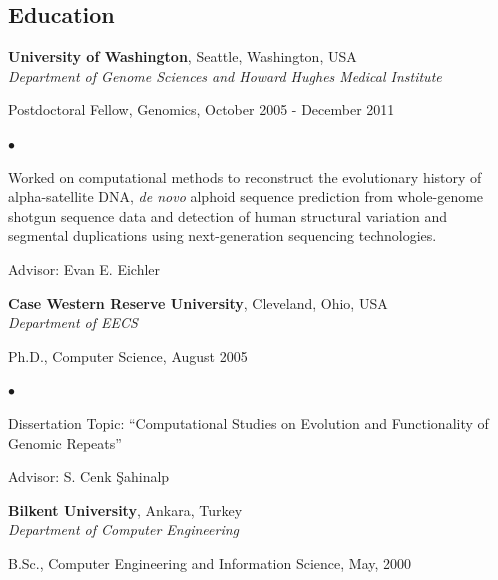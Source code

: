 \documentclass[margin,line]{res}
\newenvironment{list1}{
  \begin{list}{\ding{113}}{%
      \setlength{\itemsep}{0in}
      \setlength{\parsep}{0in} \setlength{\parskip}{0in}
      \setlength{\topsep}{0in} \setlength{\partopsep}{0in} 
      \setlength{\leftmargin}{0.17in}}}{\end{list}}
\newenvironment{list2}{
  \begin{list}{$\bullet$}{%
      \setlength{\itemsep}{0.1cm}
      \setlength{\parsep}{0in} \setlength{\parskip}{0in}
      \setlength{\topsep}{0in} \setlength{\partopsep}{0in} 
      \setlength{\leftmargin}{0.2in}}}{\end{list}}
\begin{document}
\begin{resume}
\section{\sc Education}
    {\bf University of Washington}, Seattle, Washington, USA\\
        {\em Department of Genome Sciences and Howard Hughes Medical Institute} \\
        \vspace*{-.1in}
        \begin{list1}
            \item[] Postdoctoral Fellow, Genomics, October 2005 - December 2011
            \begin{list2}
                \vspace*{.05in}
                \item
                    Worked on computational methods to reconstruct the evolutionary history of alpha-satellite DNA, {\it de novo} alphoid sequence prediction
                    from whole-genome shotgun sequence data and detection of human structural variation and segmental duplications using next-generation
                    sequencing technologies.
                \item Advisor: Evan E. Eichler
            \end{list2}
        \end{list1}
          
    {\bf Case Western Reserve University}, Cleveland, Ohio, USA\\
        {\em Department of EECS} \\
        \vspace*{-.1in}
        \begin{list1}
            \item[] Ph.D., Computer Science, August 2005
            \begin{list2}
                \vspace*{.05in}
                \item Dissertation Topic:  ``Computational Studies on Evolution and Functionality of Genomic Repeats''
                \item Advisor:  S. Cenk \c{S}ahinalp
            \end{list2}
        \end{list1}
          
    {\bf Bilkent University}, Ankara, Turkey \\
        {\em Department of Computer Engineering}\\ 
        \vspace*{-.1in}
        \begin{list1}
            \item[] B.Sc., Computer Engineering and Information Science,  May, 2000
        \end{list1}
                  

\end{resume}
\end{document}
